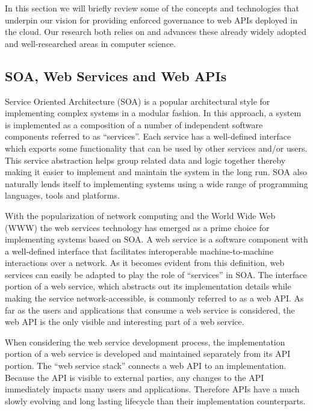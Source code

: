 In this section we will briefly review some of the concepts and technologies that underpin our vision for providing enforced governance to
web APIs deployed in the cloud. Our research both relies on and advances these already widely adopted and well-researched areas in
computer science.

\subsection{SOA, Web Services and Web APIs}
Service Oriented Architecture (SOA) is a popular architectural style for implementing complex systems in a modular fashion. In this approach, 
a system 
is implemented as a composition of a number of independent software components referred to as ``services''. Each service has a well-defined
interface which exports some functionality that can be used by other services and/or users. This service abstraction helps group related data
and logic together thereby making it easier to implement and maintain the system in the long run. SOA also naturally lends itself to implementing
systems using a wide range of programming languages, tools and platforms.

With the popularization of network computing and the World Wide Web (WWW) the web services technology has emerged as a prime choice 
for implementing systems based on SOA. A web service is a
software component with a well-defined interface that facilitates interoperable machine-to-machine interactions over a network. As it becomes 
evident from
this definition, web services can easily be adapted to play the role of  ``services'' in SOA. The interface portion of a web service, which
abstracts out its implementation details while making the service network-accessible, is commonly referred to as 
a web API. As far as the users and applications that consume a web service is considered, the web API is the only visible and
interesting part of a web service.

When considering the web service development process, the implementation portion of a web service is developed and maintained separately from
its API portion. The ``web service stack'' connects a web API to an implementation. Because the API is visible to external parties, any 
changes to the API immediately impacts many users and applications. Therefore APIs have a much slowly evolving and long lasting lifecycle than 
their implementation counterparts. 

